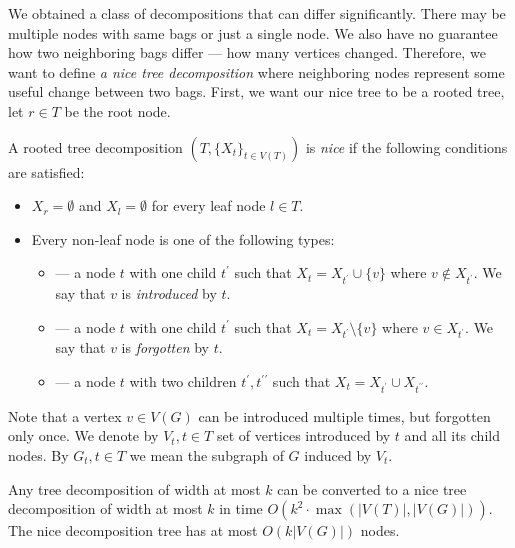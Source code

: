 We obtained a class of decompositions that can differ significantly.
There may be multiple nodes with same bags or just a single node.
We also have no guarantee how two neighboring bags differ --- how many vertices changed.
Therefore, we want to define \emph{a nice tree decomposition} where neighboring nodes
represent some useful change between two bags.
First, we want our nice tree to be a rooted tree,
let \( r \in T \) be the root node.
%
\begin{definition}
	A rooted tree decomposition
	\( (T, {\{X_t\}}_{t \in V ( T )}) \)
	is \emph{nice} if the following conditions are satisfied:
	\begin{itemize}
		\item \( X_r = \emptyset \) and \( X_l = \emptyset \) for every leaf node \( l \in T \).
		\item Every non-leaf node is one of the following types:
		      \begin{itemize}
			      \item \IntroduceVertexNode{} --- a node \( t \) with one child \( t^\prime \)
			            such that \( X_t = X_{t^\prime} \cup \{v\} \) where \( v \not\in X_{t^\prime} \).
			            We say that \( v \) is \emph{introduced} by \( t \).
			      \item \ForgetVertexNode{} --- a node \( t \) with one child \( t^\prime \)
			            such that \( X_t = X_{t^\prime} \setminus \{v\} \) where \( v \in X_{t^\prime} \).
			            We say that \( v \) is \emph{forgotten} by \( t \).
			      \item \JoinNode --- a node \( t \) with two children \( t^\prime, t^{\prime\prime} \)
			            such that \( X_t = X_{t^\prime} \cup X_{t^{\prime\prime}} \).
		      \end{itemize}
	\end{itemize}
\end{definition}
%
Note that a vertex \( v \in V(G) \) can be introduced multiple times,
but forgotten only once.
We denote by \( V_t, t \in T \) set of vertices introduced by \( t \)
and all its child nodes.
By \( G_t, t \in T \) we mean the subgraph of \( G \) induced by \( V_t \).

\begin{lemma}
	Any tree decomposition of width at most \( k \) can be converted to
	a nice tree decomposition of width at most \( k \)
	in time \( O(k^2 \cdot \max(|V(T)|, |V(G)|)) \).
	The nice decomposition tree has at most \( O(k|V(G)|) \) nodes.
\end{lemma}

